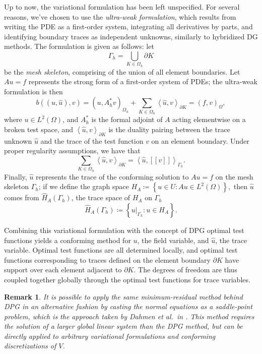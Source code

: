 \documentclass[11pt,onecolumn]{scrartcl}
\newcommand{\LRp}[1]{\left( #1 \right)}
\newcommand{\LRs}[1]{\left[ #1 \right]}
\newcommand{\LRa}[1]{\left\langle #1 \right\rangle}
\newcommand{\LRc}[1]{\left\{ #1 \right\}}
\newcommand{\jump}[1] {\ensuremath{\LRs{\!\left[#1\right]\!}}}
\newcommand{\uh}{\widehat{u}}
\renewcommand{\L}{L^2\LRp{\Omega}}
\newcommand{\Gh}{\Gamma_h}
\newcommand{\Oh}{\Omega_h}
\newtheorem{remark}{Remark}
\begin{document}
Up to now, the variational formulation has been left unspecified.  For several reasons, we've chosen to use the \textit{ultra-weak formulation}, which results from writing the PDE as a first-order system, integrating all derivatives by parts, and identifying boundary traces as independent unknowns, similarly to hybridized DG methods.  The formulation is given as follows: let $$\Gh = \bigcup_{K\in \Oh} \partial K$$ be the \textit{mesh skeleton}, comprising of the union of all element boundaries.  Let $Au=f$ represents the strong form of a first-order system of PDEs; the ultra-weak formulation is then
\begin{equation}
\label{variationalProblem}
b\LRp{\LRp{u,\uh},v} = \LRp{u,A_h^*v}_{\Oh} + \sum_{K \in \Oh} \LRa{\uh,v}_{\partial K} = \LRp{f,v}_{\Omega},
\end{equation}
where $u \in \L$, and $A_h^*$ is the formal adjoint of $A$ acting elementwise on a broken test space, and $\LRa{\uh,v}_{\partial K}$ is the duality pairing between the trace unknown $\uh$ and the trace of the test function $v$ on an element boundary.  Under proper regularity assumptions, we have that 
$$\sum_{K \in \Oh} \LRa{\uh,v}_{\partial K} = \LRa{\uh,\jump{v}}_{\Gh}.$$    %
Finally, $\uh$ represents the trace of the conforming solution to $Au=f$ on the mesh skeleton $\Gh$; if we define the graph space $H_A \coloneqq \LRc{u \in U: Au\in \L},$ then $\uh$ comes from $ \widehat{H}_A(\Gh)$, the trace space of $H_A$ on $\Gh$
\[
\widehat{H}_A(\Gh) \coloneqq \LRc{ \left.u\right|_{\Gh}: u\in H_A}.
\]

Combining this variational formulation with the concept of DPG optimal test functions yields a conforming method for $u$, the field variable, and $\uh$, the trace variable. Optimal test functions are all determined locally, and optimal test functions corresponding to traces defined on the element boundary $\partial K$ have support over each element adjacent to $\partial K$.  The degrees of freedom are thus coupled together globally through the optimal test functions for trace variables.  

\begin{remark}
\label{remarkDahmen}
It is possible to apply the same minimum-residual method behind DPG in an alternative fashion by casting the normal equations as a saddle-point problem, which is the approach taken by Dahmen et al.\ in \cite{DahmenVariationalStabilization}. This method requires the solution of a larger global linear system than the DPG method, but can be directly applied to arbitrary variational formulations and conforming discretizations of $V$.  
\end{remark}
\end{document}
